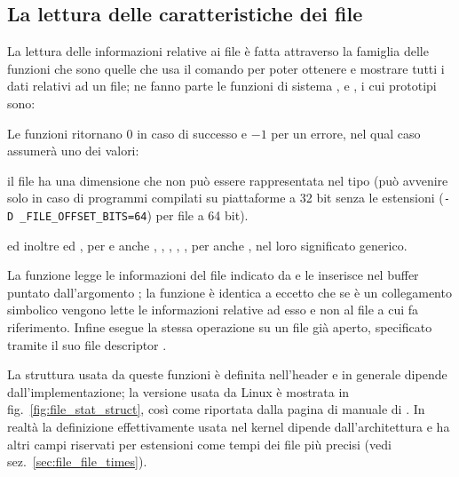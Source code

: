 \subsection{La lettura delle caratteristiche dei file}
\label{sec:file_stat}

La lettura delle informazioni relative ai file è fatta attraverso la famiglia
delle funzioni  che sono quelle che usa il comando  per
poter ottenere e mostrare tutti i dati relativi ad un file; ne fanno parte le
funzioni di sistema ,  e , i cui
prototipi sono:

\begin{funcproto}{
}
{Le funzioni ritornano $0$ in caso di successo e $-1$ per un errore, nel qual
  caso  assumerà uno dei valori:
  \begin{errlist}
    \item[\errcode{EOVERFLOW}] il file ha una dimensione che non può essere
      rappresentata nel tipo  (può avvenire solo in caso di
      programmi compilati su piattaforme a 32 bit senza le estensioni
      (\texttt{-D \_FILE\_OFFSET\_BITS=64}) per file a 64 bit).
  \end{errlist}
  ed inoltre  ed , per  e
   anche , , ,
  , , per  anche , 
  nel loro significato generico.}
\end{funcproto}

La funzione  legge le informazioni del file indicato
da  e le inserisce nel buffer puntato
dall'argomento ; la funzione  è identica a 
eccetto che se  è un collegamento simbolico vengono lette le
informazioni relative ad esso e non al file a cui fa riferimento. Infine
 esegue la stessa operazione su un file già aperto, specificato
tramite il suo file descriptor .

La struttura  usata da queste funzioni è definita nell'header
 e in generale dipende dall'implementazione; la versione
usata da Linux è mostrata in fig.~\ref{fig:file_stat_struct}, così come
riportata dalla pagina di manuale di . In realtà la definizione
effettivamente usata nel kernel dipende dall'architettura e ha altri campi
riservati per estensioni come tempi dei file più precisi (vedi
sez.~\ref{sec:file_file_times}).

